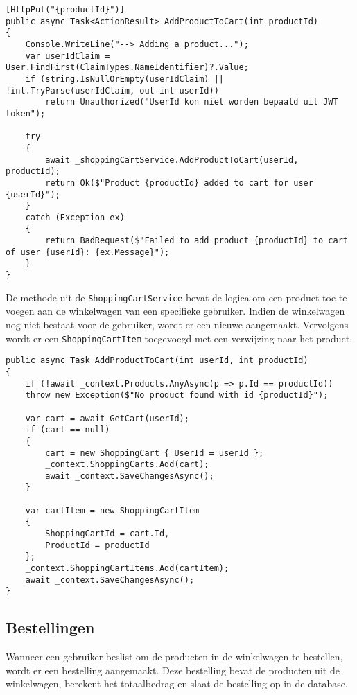 \begin{lstlisting}[style=mystyleA, caption=ShoppingCartsController.cs (fragment), label=lst:MonoShoppingCartController]
[HttpPut("{productId}")]
public async Task<ActionResult> AddProductToCart(int productId)
{
	Console.WriteLine("--> Adding a product...");
	var userIdClaim = User.FindFirst(ClaimTypes.NameIdentifier)?.Value;
	if (string.IsNullOrEmpty(userIdClaim) || !int.TryParse(userIdClaim, out int userId))
		return Unauthorized("UserId kon niet worden bepaald uit JWT token");
	
	try
	{
		await _shoppingCartService.AddProductToCart(userId, productId);
		return Ok($"Product {productId} added to cart for user {userId}");
	}
	catch (Exception ex)
	{
		return BadRequest($"Failed to add product {productId} to cart of user {userId}: {ex.Message}");
	}
}
\end{lstlisting}

\medskip
De methode uit de \texttt{ShoppingCartService} bevat de logica om een product toe te voegen aan de winkelwagen van een specifieke gebruiker. Indien de winkelwagen nog niet bestaat voor de gebruiker, wordt er een nieuwe aangemaakt. Vervolgens wordt er een \texttt{ShoppingCartItem} toegevoegd met een verwijzing naar het product.
\medskip

\begin{lstlisting}[style=mystyleA, caption=ShoppingCartService.cs (fragment), label=lst:MonoShoppingCartService]
public async Task AddProductToCart(int userId, int productId)
{
	if (!await _context.Products.AnyAsync(p => p.Id == productId))
	throw new Exception($"No product found with id {productId}");
	
	var cart = await GetCart(userId);
	if (cart == null)
	{
		cart = new ShoppingCart { UserId = userId };
		_context.ShoppingCarts.Add(cart);
		await _context.SaveChangesAsync();
	}
	
	var cartItem = new ShoppingCartItem
	{
		ShoppingCartId = cart.Id,
		ProductId = productId
	};
	_context.ShoppingCartItems.Add(cartItem);
	await _context.SaveChangesAsync();
}
\end{lstlisting}

\subsection{Bestellingen}

Wanneer een gebruiker beslist om de producten in de winkelwagen te bestellen, wordt er een bestelling aangemaakt. Deze bestelling bevat de producten uit de winkelwagen, berekent het totaalbedrag en slaat de bestelling op in de database.

